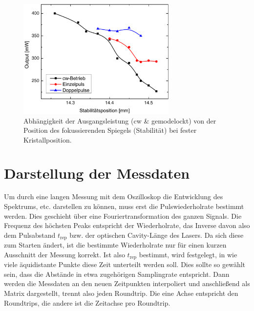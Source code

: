 \documentclass[bachelor,       %
               twoside,        %
               BCOR10mm,       %
               english,ngerman, %
               ]{GAUBM}
\begin{document}
\begin{figure}[!htb]
	\centering
	\includegraphics[width=0.7\textwidth]{figures/map2.pdf}
	\caption{Abhängigkeit der Ausgangsleistung (cw \& gemodelockt) von der Position des fokussierenden Spiegels (Stabilität) bei fester Kristallposition.}
	\label{fig:map2}
\end{figure}


\section{Darstellung der Messdaten}
Um durch eine langen Messung mit dem Oszilloskop die Entwicklung des Spektrums, etc. darstellen zu können, muss erst die Pulswiederholrate bestimmt werden.
Dies geschieht über eine Fouriertransformation des ganzen Signals.
Die Frequenz des höchsten Peaks entspricht der Wiederholrate, das Inverse davon also dem Pulsabstand $t_\text{rep}$ bzw. der optischen Cavity-Länge des Lasers.
Da sich diese zum Starten ändert, ist die bestimmte Wiederholrate nur für einen kurzen Ausschnitt der Messung korrekt.
Ist also $t_\text{rep}$ bestimmt, wird festgelegt, in wie viele äquidistante Punkte diese Zeit unterteilt werden soll.
Dies sollte so gewählt sein, dass die Abstände in etwa zugehörigen Samplingrate entspricht.
Dann werden die Messdaten an den neuen Zeitpunkten interpoliert und anschließend als Matrix dargestellt, trennt also jeden Roundtrip.
Die eine Achse entspricht den Roundtrips, die andere ist die Zeitachse pro Roundtrip.
\end{document}
